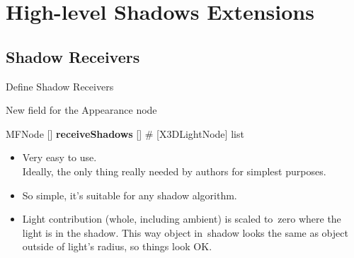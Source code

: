 \documentclass{beamer}
\newcommand*{\codeem}[1]{\textbf{#1}}
\begin{document}
\section{High-level Shadows Extensions}

\subsection{Shadow Receivers}

\begin{frame}[fragile]{Define Shadow Receivers}
\begin{block}{New field for the Appearance node}
\begin{semiverbatim}
MFNode  []  \codeem{receiveShadows}  []
  \# [X3DLightNode] list
\end{semiverbatim}
\end{block}

  \begin{itemize}
    \item Very easy to use.\\
      Ideally, the only thing really needed by authors for simplest purposes.
    \item So simple, it's suitable for any shadow algorithm.
    \item Light contribution (whole, including ambient) is scaled to~zero
      where the light is in the shadow. This way object in~shadow looks
      the same as object outside of light's radius, so things look OK.
  \end{itemize}
\end{frame}
\end{document}
